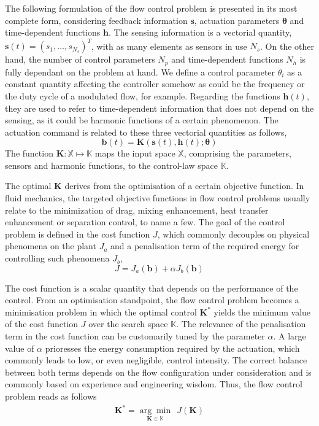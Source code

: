The following formulation of the flow control problem is presented in its most complete form, considering feedback information $\bm{s}$, actuation parameters $\bm{\theta}$ and time-dependent functions $\bm{h}$. The sensing information is a vectorial quantity, $\bm{s}(t) = (s_1, \ldots ,s_{N_s})^T$, with as many elements as sensors in use $N_s$. On the other hand, the number of control parameters $N_p$ and time-dependent functions $N_h$ is fully dependant on the problem at hand. We define a control parameter $\theta_i$ as a constant quantity affecting the controller somehow as could be the frequency or the duty cycle of a modulated flow, for example. Regarding the functions $\bm{h}(t)$, they are used to refer to time-dependent information that does not depend on the sensing, as it could be harmonic functions of a certain phenomenon. The actuation command is related to these three vectorial quantities as follows,
%
\begin{equation}
    \bm{b}(t) = \bm{K}(\bm{s}(t),\bm{h}(t);\bm{\theta})
\end{equation}
%
The function $\bm{K}: \mathbb{X} \mapsto \mathbb{K}$  maps the input space $\mathbb{X}$, comprising the parameters, sensors and harmonic functions, to the control-law space $\mathbb{K}$. 

The optimal $\bm{K}$ derives from the optimisation of a certain objective function. In fluid mechanics, the targeted objective functions in flow control problems usually relate to the minimization of drag, mixing enhancement, heat transfer enhancement or separation control, to name a few. The goal of the control problem is defined in the cost function $J$, which commonly decouples on physical phenomena on the plant $J_a$ and a penalisation term of the required energy for controlling such phenomena $J_b$,
%
\begin{equation}
    J = J_a(\bm{b}) + \alpha J_b(\bm{b})
\end{equation}

The cost function is a scalar quantity that depends on the performance of the control. From an optimisation standpoint, the flow control problem becomes a minimisation problem in which the optimal control $\bm{K^*}$ yields the minimum value of the cost function $J$ over the search space $\mathbb{K}$. The relevance of the penalisation term in the cost function can be customarily tuned by the parameter $\alpha$. A large value of $\alpha$ prioresses the energy consumption required by the actuation, which commonly leads to low, or even negligible, control intensity. The correct balance between both terms depends on the flow configuration under consideration and is commonly based on experience and engineering wisdom. Thus, the flow control problem reads as follows
%
\begin{equation}\label{eq:Optproblem}
    \begin{aligned}
        \bm{K}^{*} = \underset{{\bm{K} \in \mathbb{K}}}{\arg\min}~~ J(\bm{K})
    \end{aligned}
\end{equation}

